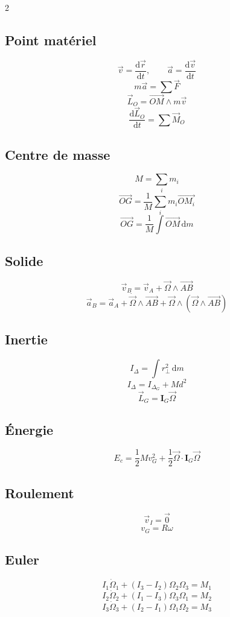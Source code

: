 \documentclass[11pt,a4paper]{article}
\newcommand{\vect}[1]{\overrightarrow{#1}}
\newcommand{\dd}{\,\mathrm{d}}
\newcommand{\der}[2]{\frac{\mathrm{d}#1}{\mathrm{d}#2}}
\newcommand{\mat}[1]{\mathbf{#1}}
\begin{document}
\begin{multicols}{2}

\subsection*{Point matériel}
\[
\vec v=\der{\vec r}{t},\qquad
\vec a=\der{\vec v}{t}
\]
\[
m\vec a=\sum\vec F
\]
\[
\vec L_O=\vect{OM}\wedge m\vec v
\]
\[
\der{\vec L_O}{t}=\sum \vec M_O
\]

\subsection*{Centre de masse}
\[
M=\sum_i m_i
\]
\[
\vect{OG}=\frac1M\sum_i m_i\vect{OM_i}
\]
\[
\vect{OG}=\frac1M\int \vect{OM}\dd m
\]

\subsection*{Solide}
\[
\vec v_B=\vec v_A+\vec\Omega\wedge\vect{AB}
\]
\[
\vec a_B=\vec a_A+\dot{\vec\Omega}\wedge\vect{AB}
+\vec\Omega\wedge(\vec\Omega\wedge\vect{AB})
\]

\subsection*{Inertie}
\[
I_\Delta=\int r_\perp^2\dd m
\]
\[
I_\Delta=I_{\Delta_G}+Md^2
\]
\[
\vec L_G=\mat I_G\vec\Omega
\]

\subsection*{Énergie}
\[
E_c=\frac12Mv_G^2+\frac12\vec\Omega\cdot\mat I_G\vec\Omega
\]

\subsection*{Roulement}
\[
\vec v_I=\vec 0
\]
\[
v_G=R\omega
\]

\subsection*{Euler}
\[
I_1\dot\Omega_1+(I_3-I_2)\Omega_2\Omega_3=M_1
\]
\[
I_2\dot\Omega_2+(I_1-I_3)\Omega_3\Omega_1=M_2
\]
\[
I_3\dot\Omega_3+(I_2-I_1)\Omega_1\Omega_2=M_3
\]

\end{multicols}

\end{document}
